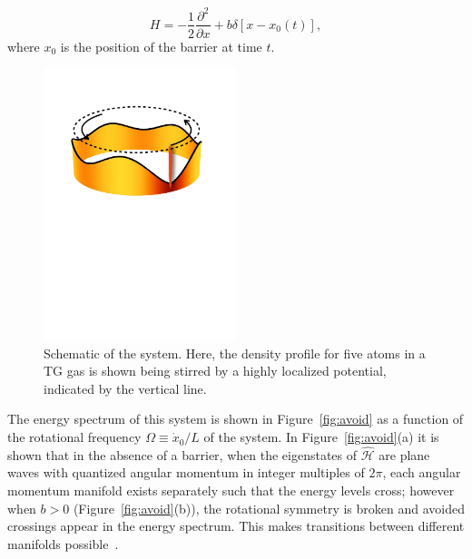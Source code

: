 \begin{equation}
H = -\frac{1}{2} \frac{\partial^2}{\partial x} + b\delta \left[ x-x_0(t) \right], 
\end{equation}
where $x_0$ is the position of the barrier at time $t$. 

\begin{figure}
\center \includegraphics[width = 0.5\textwidth]{data/1d/scheme.pdf}
\caption{Schematic of the system.
Here, the density profile for five atoms in a TG gas is shown being stirred by a highly localized potential, indicated by the vertical line.}
\label{fig:ring_scheme}
\end{figure}

The energy spectrum of this system is shown in Figure~\ref{fig:avoid} as a function of the rotational frequency $\Omega \equiv \dot x_0 /L$ of the system.
In Figure~\ref{fig:avoid}(a) it is shown that in the absence of a barrier, when the eigenstates of $\mathcal{\hat H}$ are plane waves with quantized angular momentum in integer multiples of $2 \pi$, each angular momentum manifold exists separately such that the energy levels cross; however when $b>0$ (Figure~\ref{fig:avoid}(b)), the rotational symmetry is broken and avoided crossings appear in the energy spectrum.
This makes transitions between different manifolds possible~\cite{schenke2012}.

